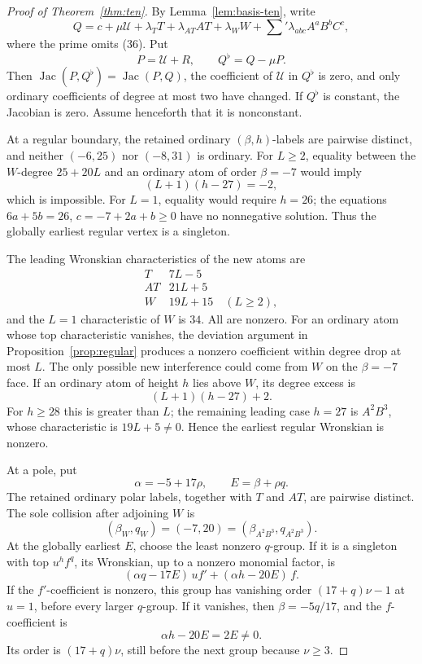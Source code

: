 \documentclass[11pt]{article}
\theoremstyle{remark}
\newcommand{\Jac}{\operatorname{Jac}}
\newcommand{\cU}{\mathcal U}
\begin{document}
\begin{proof}[Proof of Theorem~\ref{thm:ten}]
By Lemma~\ref{lem:basis-ten}, write
\[
Q=c+\mu\cU+\lambda_TT+\lambda_{AT}AT+\lambda_WW
+\sum\nolimits'\lambda_{abc}A^aB^bC^c,
\tag{41}
\]
where the prime omits (36).  Put
\[
P=\cU+R,\qquad Q^\flat=Q-\mu P.
\tag{42}
\]
Then \(\Jac(P,Q^\flat)=\Jac(P,Q)\), the coefficient of \(\cU\) in
\(Q^\flat\) is zero, and only ordinary coefficients of degree at most
two have changed.  If \(Q^\flat\) is constant, the Jacobian is zero.
Assume henceforth that it is nonconstant.

At a regular boundary, the retained ordinary \((\beta,h)\)-labels are
pairwise distinct, and neither \((-6,25)\) nor \((-8,31)\) is ordinary.
For \(L\ge2\), equality between the \(W\)-degree \(25+20L\) and an
ordinary atom of order \(\beta=-7\) would imply
\[
(L+1)(h-27)=-2,
\tag{43}
\]
which is impossible.  For \(L=1\), equality would require \(h=26\);
the equations \(6a+5b=26\), \(c=-7+2a+b\ge0\) have no nonnegative
solution.  Thus the globally earliest regular vertex is a singleton.

The leading Wronskian characteristics of the new atoms are
\[
\begin{array}{c|c}
T&7L-5\\
AT&21L+5\\
W&19L+15\quad(L\ge2),
\end{array}
\tag{44}
\]
and the \(L=1\) characteristic of \(W\) is \(34\).  All are nonzero.
For an ordinary atom whose top characteristic vanishes, the deviation
argument in Proposition~\ref{prop:regular} produces a nonzero coefficient
within degree drop at most \(L\).  The only possible new interference
could come from \(W\) on the \(\beta=-7\) face.  If an ordinary atom of
height \(h\) lies above \(W\), its degree excess is
\[
(L+1)(h-27)+2.
\tag{45}
\]
For \(h\ge28\) this is greater than \(L\); the remaining leading case
\(h=27\) is \(A^2B^3\), whose characteristic is \(19L+5\ne0\).
Hence the earliest regular Wronskian is nonzero.

At a pole, put
\[
\alpha=-5+17\rho,\qquad E=\beta+\rho q.
\tag{46}
\]
The retained ordinary polar labels, together with \(T\) and \(AT\), are
pairwise distinct.  The sole collision after adjoining \(W\) is
\[
(\beta_W,q_W)=(-7,20)
=(\beta_{A^2B^3},q_{A^2B^3}).
\tag{47}
\]
At the globally earliest \(E\), choose the least nonzero \(q\)-group.
If it is a singleton with top \(u^hf^q\), its Wronskian, up to a
nonzero monomial factor, is
\[
(\alpha q-17E)\,u f'
+(\alpha h-20E)\,f.
\tag{48}
\]
If the \(f'\)-coefficient is nonzero, this group has vanishing order
\((17+q)\nu-1\) at \(u=1\), before every larger \(q\)-group.  If it
vanishes, then \(\beta=-5q/17\), and the \(f\)-coefficient is
\[
\alpha h-20E=2E\ne0.
\tag{49}
\]
Its order is \((17+q)\nu\), still before the next group because
\(\nu\ge3\).


\end{proof}
\end{document}
